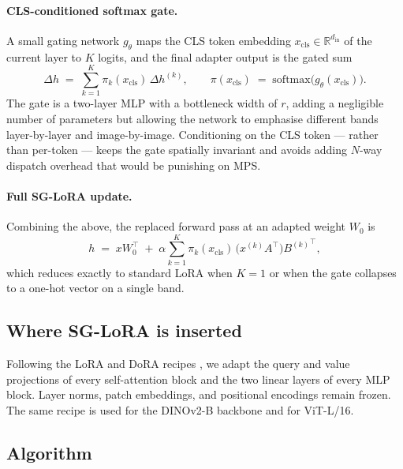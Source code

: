 \documentclass{article}
\begin{document}
\paragraph{CLS-conditioned softmax gate.} A small gating network $g_\theta$ maps the CLS token embedding $x_{\text{cls}} \in \mathbb{R}^{d_{\text{in}}}$ of the current layer to $K$ logits, and the final adapter output is the gated sum
\begin{equation}
\Delta h \;=\; \sum_{k=1}^{K} \pi_k(x_{\text{cls}})\, \Delta h^{(k)}, \qquad \pi(x_{\text{cls}}) \;=\; \mathrm{softmax}\bigl(g_\theta(x_{\text{cls}})\bigr).
\end{equation}
The gate is a two-layer MLP with a bottleneck width of $r$, adding a negligible number of parameters but allowing the network to emphasise different bands layer-by-layer and image-by-image. Conditioning on the CLS token — rather than per-token — keeps the gate spatially invariant and avoids adding $N$-way dispatch overhead that would be punishing on MPS.

\paragraph{Full SG-LoRA update.} Combining the above, the replaced forward pass at an adapted weight $W_0$ is
\begin{equation}
h \;=\; x W_0^{\top} \;+\; \alpha \sum_{k=1}^{K} \pi_k(x_{\text{cls}}) \, \bigl(x^{(k)} A^{\top}\bigr) {B^{(k)}}^{\top},
\end{equation}
which reduces exactly to standard LoRA when $K = 1$ or when the gate collapses to a one-hot vector on a single band.

\subsection{Where SG-LoRA is inserted}

Following the LoRA and DoRA recipes \citep{hu2022lora, liu2024dora}, we adapt the query and value projections of every self-attention block and the two linear layers of every MLP block. Layer norms, patch embeddings, and positional encodings remain frozen. The same recipe is used for the DINOv2-B backbone \citep{oquab2024dinov2} and for ViT-L/16.

\subsection{Algorithm}
\end{document}

